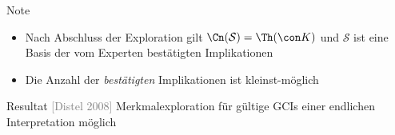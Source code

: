 \documentclass[ngerman]{beamer}
\newcommand{\pseudocite}[1]{\textcolor{gray}{[#1]}}
\begin{document}
\begin{frame}

  \vspace*{-4ex}
  \begin{block}{Note}
    \begin{itemize}
    \item<10-> Nach Abschluss der Exploration gilt $\Cn(\mathcal{S}) = \Th(\con K)$ und
      $\mathcal{S}$ ist eine Basis der vom Experten bestätigten Implikationen
    \item<11-> Die Anzahl der \emph{bestätigten} Implikationen ist kleinst-möglich
    \end{itemize}
  \end{block}


  \begin{block}{Resultat \pseudocite{Distel 2008}}
    Merkmalexploration für gültige GCIs einer endlichen Interpretation möglich
  \end{block}
  
\end{frame}
\end{document}
